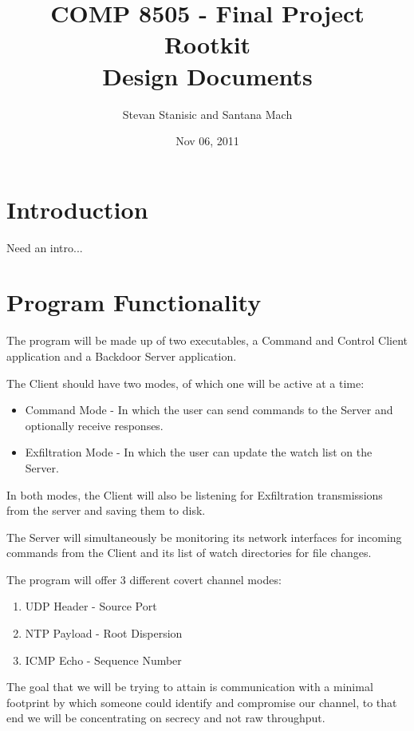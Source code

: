 \documentclass[titlepage]{article}
\begin{document}
\author{Stevan Stanisic and Santana Mach}
\title{COMP 8505 - Final Project \\ Rootkit \\ Design Documents}
\date{Nov 06, 2011}
\maketitle{}

\tableofcontents
\pagebreak

\section{Introduction}

Need an intro...

\section{Program Functionality}

The program will be made up of two executables, a Command and Control Client application and a Backdoor Server application.

The Client should have two modes, of which one will be active at a time:
\begin{itemize}
  \item Command Mode - In which the user can send commands to the Server and optionally receive responses.
  \item Exfiltration Mode - In which the user can update the watch list on the Server.
\end{itemize}

In both modes, the Client will also be listening for Exfiltration transmissions from the server and saving them to disk.

The Server will simultaneously be monitoring its network interfaces for incoming commands from the Client and its list of
watch directories for file changes.

The program will offer 3 different covert channel modes:
\begin{enumerate}
  \item UDP Header - Source Port
  \item NTP Payload - Root Dispersion
  \item ICMP Echo - Sequence Number
\end{enumerate}

The goal that we will be trying to attain is communication with a minimal footprint by which someone could identify and compromise our channel, to
that end we will be concentrating on secrecy and not raw throughput.
\end{document}
